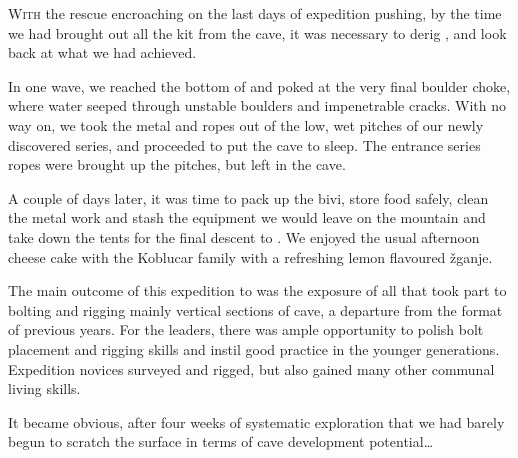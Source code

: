 \newpage
\thispagestyle{endchapter}
\begin{tcolorbox}
	\vspace{80pt}
	\lettrine{W}{ith} the rescue encroaching on the last days of expedition pushing, by the time we had  brought out all the kit from the cave, it was necessary to derig , and look back at what we had achieved.

 	In one wave, we reached the bottom of  and poked at the very final boulder choke, where water seeped through unstable boulders and impenetrable cracks. With no way on, we took the metal and ropes out of the low, wet pitches of our newly discovered series, and proceeded to put the cave to sleep. The entrance series ropes were brought up the pitches, but left in the cave.

	A couple of days later, it was time to pack up the bivi, store food safely, clean the metal work and stash the equipment we would leave on the mountain and take down the tents for the final descent to . We enjoyed the usual afternoon cheese cake with the Koblucar family with a refreshing lemon flavoured \v{z}ganje.

	The main outcome of this expedition to  was the exposure of all that took part to bolting and rigging mainly vertical sections of cave, a departure from the format of previous years. For the leaders, there was ample opportunity to polish bolt placement and rigging skills and instil good practice in the younger generations. Expedition novices surveyed and rigged, but also gained many other communal living skills.

	It became obvious, after four weeks of systematic exploration that we had barely begun to scratch the surface in terms of cave development potential…

\end{tcolorbox}

